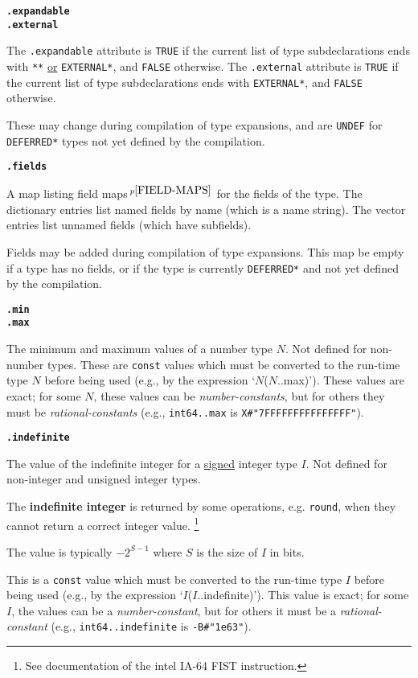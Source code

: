 \documentclass[12pt]{article}
\newcommand{\key}[1]{{\rm \bfseries #1}}
\newcommand{\ttkey}[1]{{\tt \bfseries #1}}
\newcommand{\pagnote}[1]{$\,^{p\pageref{#1}}$}
\newenvironment{indpar}[1][0.3in]%
	{\begin{list}{}%
		     {\setlength{\itemsep}{0in}%
		      \setlength{\topsep}{0in}%
		      \setlength{\parsep}{1ex}%
		      \setlength{\labelwidth}{#1}%
		      \setlength{\leftmargin}{#1}%
		      \addtolength{\leftmargin}{\labelsep}}%
	 \item}%
	{\end{list}}
\begin{document}
\ttkey{.expandable} \\
\ttkey{.external}
\begin{indpar}
The {\tt .expandable} attribute is {\tt TRUE} if the
current list of type subdeclarations ends with
{\tt ***} \underline{or} {\tt *EXTERNAL*},
and {\tt FALSE} otherwise.
The {\tt .external} attribute is {\tt TRUE} if the current
list of type subdeclarations ends with
{\tt *EXTERNAL*}, and {\tt FALSE} otherwise.

These may change during compilation of type expansions, and are
{\tt UNDEF} for {\tt *DEFER\-RED*} types not yet defined by the
compilation.
\end{indpar}

\ttkey{.fields}
\begin{indpar}
A map listing field maps\pagnote{FIELD-MAPS} for the fields of the type.
The dictionary entries list named fields by name (which is a name string).
The vector entries list unnamed fields
(which have subfields).

Fields may be added during compilation of type expansions.
This map be empty if a type has no fields, or if the type is
currently {\tt *DEFERRED*} and not yet defined by the
compilation.
\end{indpar}

\ttkey{.min} \\
\ttkey{.max}
\begin{indpar}
The minimum and maximum values of a number type $N$.  Not defined for
non-number types.  These are {\tt const} values which must be
converted to the run-time type $N$ before being used
(e.g., by the expression `$N$($N$..max)').  These values are exact;
for some $N$, these values can be {\em number-constants}, but
for others they must be {\em rational-constants}
(e.g., {\tt int64..max} is {\tt X\#"7FFFFFFFFFFFFFFF"}).
\end{indpar}

\ttkey{.indefinite}
\begin{indpar}
The value of the indefinite integer for a \underline{signed} integer type $I$.
Not defined for non-integer and unsigned integer types.

The \key{indefinite integer}\label{INDEFINITE-INTEGER} is returned by
some operations, e.g. {\tt round},
when they cannot return a correct integer value.%
\footnote{See documentation of the intel IA-64 FIST instruction.}

The value is typically $-2^{S-1}$ where $S$ is the size of $I$ in bits.

This is a {\tt const} value which must be
converted to the run-time type $I$ before being used
(e.g., by the expression `$I$($I$..indefinite)').  This value is exact;
for some $I$, the values can be a {\em number-constant}, but
for others it must be a {\em rational-constant}
(e.g., {\tt int64..indefinite} is {\tt -B\#"1e63"}).
\end{indpar}
\end{document}
